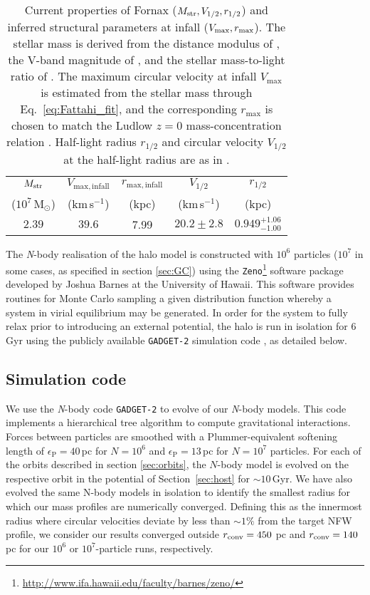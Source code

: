 \documentclass[fleqn,usenatbib]{mnras}
\begin{document}
\begin{table}
	\centering
	\caption{Current properties of Fornax ($M_{\rm str}, V_{1/2}, r_{1/2}$) and inferred structural parameters at infall ($V_{\rm max}, r_{\rm max}$). The stellar mass is derived from the distance modulus of \citet{Pietrzynski2009}, the V-band magnitude of \citet{Irwin95}, and the stellar mass-to-light ratio of \citet{Woo2008}. The maximum circular velocity at infall $V_\mathrm{max}$ is estimated from the stellar mass through Eq.~\ref{eq:Fattahi_fit}, and the corresponding $r_\mathrm{max}$ is chosen to match the Ludlow $z=0$ mass-concentration relation \citep{Ludlow2016}. Half-light radius $r_{1/2}$ and circular velocity $V_{1/2}$ at the half-light radius are as in \citet{Fattahi2018}.}
	\label{tab:Fornax_structure}
	\begin{tabular}{ccccc}
		\hline
		$M_{\rm str}$ & $V_\mathrm{max, infall}$ & $r_\mathrm{max, infall}$ & $V_{1/2}$ & $r_{1/2}$\\
		($10^7$\,M$_\odot$) & (km\,s$^{-1}$) & (kpc) & (km\,s$^{-1}$) & (kpc)\\
		\hline
		$2.39$ & $39.6$ & 7.99 & $20.2\pm 2.8$ & $0.949^{+1.06}_{-1.00}$\\
		\hline
	\end{tabular}
\end{table}

The \textit{N}-body realisation of the halo model is constructed with $10^6$ particles ($10^7$ in some cases, as specified in section \ref{sec:GC}) using the \texttt{Zeno}\footnote{\url{http://www.ifa.hawaii.edu/faculty/barnes/zeno/}} software package developed by Joshua Barnes at the University of Hawaii. This software provides routines for Monte Carlo sampling a given distribution function whereby a system in virial equilibrium may be generated. In order for the system to fully relax prior to introducing an external potential, the halo is run in isolation for 6\,Gyr using the publicly available \texttt{GADGET-2} simulation code \citep{Springel2005}, as detailed below.

\subsection{Simulation code}
\label{sec:code}
We use the \textit{N}-body code \texttt{GADGET-2} \citep{Springel2005} to evolve of our \textit{N}-body models. This code implements a hierarchical tree algorithm to compute gravitational interactions. Forces between particles are smoothed with a Plummer-equivalent softening length of $\epsilon_\mathrm{P} = 40$\,pc for $N=10^6$ and $\epsilon_\mathrm{P} = 13$\,pc for $N=10^7$ particles. For each of the orbits described in section \ref{sec:orbits}, the $N$-body model is evolved on the respective orbit in the potential of Section~\ref{sec:host} for $\sim10$\,Gyr. We have also evolved the same N-body models in isolation to identify the smallest radius for which our mass profiles are numerically converged. Defining this as the innermost radius where circular velocities deviate by less than $\sim1\%$ from the target NFW profile, we consider our results converged outside $r_{\rm conv}=450$ pc and $r_{\rm conv}=140$ pc for our $10^6$ or $10^7$-particle runs, respectively.
\end{document}
